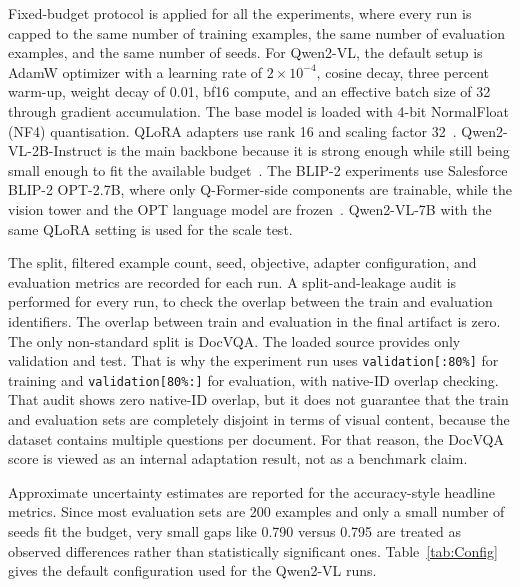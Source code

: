 \documentclass[preprint,12pt]{elsarticle}
\begin{document}
Fixed-budget protocol is applied for all the experiments, 
where every run is capped to the same number of training examples,
the same number of evaluation examples, and the same number of seeds.
For Qwen2-VL, the default setup is AdamW optimizer with a learning rate of $2 \times 10^{-4}$,
cosine decay, three percent warm-up, weight decay of 0.01, bf16 compute, and an effective batch size of 32 through gradient accumulation.
The base model is loaded with 4-bit NormalFloat (NF4) quantisation.
QLoRA adapters use rank 16 and scaling factor 32~\cite{hu2022lora,dettmers2023qlora}.
Qwen2-VL-2B-Instruct is the main backbone because it is strong enough while still being small enough to fit the available budget~\cite{wang2024qwen2vl}.
The BLIP-2 experiments use Salesforce BLIP-2 OPT-2.7B, where only Q-Former-side components are trainable, while the vision tower and the OPT language model are frozen~\cite{li2023blip2}.
Qwen2-VL-7B with the same QLoRA setting is used for the scale test.

The split, filtered example count, seed, objective, adapter configuration, and evaluation metrics are recorded for each run.
A split-and-leakage audit is performed for every run, to check the overlap between the train and evaluation identifiers.
The overlap between train and evaluation in the final artifact is zero.
The only non-standard split is DocVQA.
The loaded source provides only validation and test.
That is why the experiment run uses \texttt{validation[:80\%]} for training and \texttt{validation[80\%:]} for evaluation, with native-ID overlap checking.
That audit shows zero native-ID overlap, but it does not guarantee that the train and evaluation sets are completely disjoint in terms of visual content, because the dataset contains multiple questions per document.
For that reason, the DocVQA score is viewed as an internal adaptation result, not as a benchmark claim.

Approximate uncertainty estimates are reported for the accuracy-style headline metrics.
Since most evaluation sets are 200 examples and only a small number of seeds fit the budget,
very small gaps like 0.790 versus 0.795 are treated as observed differences rather than statistically significant ones.
Table~\ref{tab:Config} gives the default configuration used for the Qwen2-VL runs.
\end{document}
